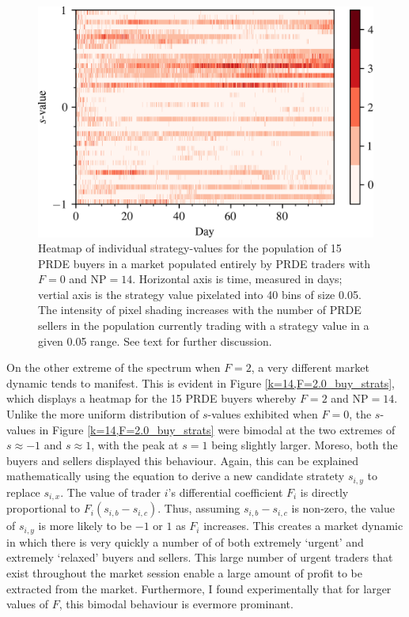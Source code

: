 \documentclass[conference]{IEEEtran}
\begin{document}
\begin{figure}[htbp]
    \centerline{\includegraphics[width=\columnwidth]{k=14,F=0.0_buy_strats.png}}
    \caption{
        Heatmap of individual strategy-values for the population of 15 PRDE buyers in a market populated entirely by PRDE traders with $F=0$ and $\mathrm{NP}=14$.
        Horizontal axis is time, measured in days; vertial axis is the strategy value pixelated into 40 bins of size 0.05.
        The intensity of pixel shading increases with the number of PRDE sellers in the population currently trading with a strategy value in a given 0.05 range.
        See text for further discussion.
    }
    \label{k=14,F=0.0_buy_strats}
\end{figure}

On the other extreme of the spectrum when $F=2$, a very different market dynamic tends to manifest.
This is evident in Figure \ref{k=14,F=2.0_buy_strats}, which displays a heatmap for the 15 PRDE buyers whereby $F=2$ and $\mathrm{NP}=14$.
Unlike the more uniform distribution of $s$-values exhibited when $F=0$, the $s$-values in Figure \ref{k=14,F=2.0_buy_strats} were bimodal at the two extremes of $s\approx-1$ and $s\approx1$, with the peak at $s=1$ being slightly larger.
Moreso, both the buyers and sellers displayed this behaviour.
Again, this can be explained mathematically using the equation to derive a new candidate stratety $s_{i,y}$ to replace $s_{i,x}$.
The value of trader $i$'s differential coefficient $F_i$ is directly proportional to $F_i(s_{i,b}-s_{i,c})$.
Thus, assuming $s_{i,b}-s_{i,c}$ is non-zero, the value of $s_{i,y}$ is more likely to be $-1$ or $1$ as $F_i$ increases.
This creates a market dynamic in which there is very quickly a number of of both extremely `urgent' and extremely `relaxed' buyers and sellers.
This large number of urgent traders that exist throughout the market session enable a large amount of profit to be extracted from the market.
Furthermore, I found experimentally that for larger values of $F$, this bimodal behaviour is evermore prominant.
\end{document}
